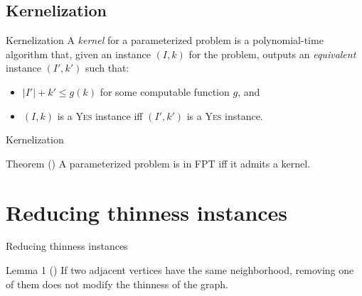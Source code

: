 \documentclass{beamer}
\begin{document}
\subsection{Kernelization}
\begin{frame}{Kernelization}
    A \emph{kernel} for a parameterized problem is a polynomial-time algorithm that, given an instance $(I,k)$ for the problem, outputs an \emph{equivalent} instance $(I',k')$ such that:
    \begin{itemize}
        \item $|I'| + k' \leq g(k)$ for some computable function $g$, and
        \item $(I,k)$ is a \textsc{Yes} instance iff $(I',k')$ is a \textsc{Yes} instance.
    \end{itemize}
\end{frame}

\begin{frame}{Kernelization}
    \begin{block}{Theorem (\cite{parameterized-algorithms})}
        A parameterized problem is in FPT iff it admits a kernel.
    \end{block}
\end{frame}

\section{Reducing thinness instances}
\begin{frame}{Reducing thinness instances}
    \begin{block}{Lemma 1 (\cite{thinness-of-product-graphs})}
        If two adjacent vertices have the same neighborhood, removing one of them does not modify the thinness of the graph.
    \end{block}

    \begin{figure}
        \centering
    \end{figure}
\end{frame}
\end{document}
